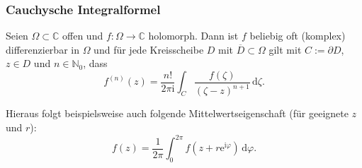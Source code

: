 \documentclass[10pt]{beamer}
\newcommand{\iu}{\mathrm{i}}
\begin{document}
\begin{frame}
	\frametitle{Cauchysche Integralformel}
	\pause
	\begin{theorem}
		Seien $\Omega \subset \mathbb{C}$ offen und $f \colon \Omega \to \mathbb{C}$ holomorph.
		Dann ist $f$ beliebig oft (komplex) differenzierbar in $\Omega$ und für jede Kreisscheibe $D$ mit $\overline{D} \subset \Omega$ gilt mit $C := \partial D$, $z \in D$ und $n \in \mathbb{N}_0$, dass
		\[
			f^{(n)}(z) = \frac{n!}{2 \pi \iu} \int_{C} \frac{f(\zeta)}{(\zeta - z)^{n + 1}} \,\mathrm{d}\zeta.
		\]
	\end{theorem}
	\pause
	Hieraus folgt beispielsweise auch folgende Mittelwertseigenschaft (für geeignete $z$ und $r$):
	\[
		f(z) = \frac{1}{2 \pi} \int_{0}^{2 \pi} f(z + r \mathrm{e}^{\iu \varphi}) \,\mathrm{d}\varphi.
	\]
\end{frame}
\end{document}
